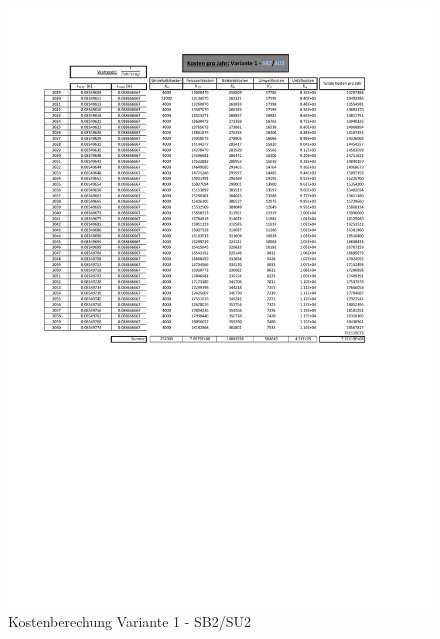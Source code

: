 \begin{figure}[h!]
	\centering
	\includegraphics[width=\textwidth]{figures/Anhang/f-00-A-V1-B2-U2}
	\caption{Kostenberechung Variante 1 - SB2/SU2}
\end{figure}

